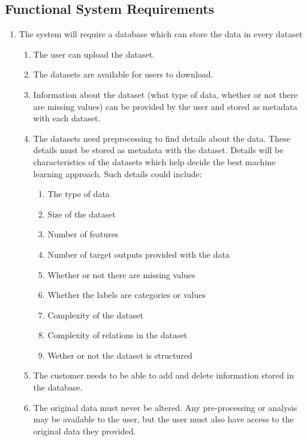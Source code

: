 \documentclass[titlepage]{article}
\begin{document}
\subsection{Functional System Requirements}

\begin{enumerate}
  \item The system will require a database which can store the data in every dataset
  
  \begin{enumerate}
    \item The user can upload the dataset.
  
    \item The datasets are available for users to download.
    
    \item Information about the dataset (what type of data, whether or not there are missing values) can be provided by the user and stored as metadata with each dataset.
    
    \item The datasets need preprocessing to find details about the data. These details must be stored as metadata with the dataset. Details will be characteristics of the datasets which help decide the best machine learning approach. Such details could include:
    \begin{enumerate}
      \item The type of data
      \item Size of the dataset
      \item Number of features
      \item Number of target outputs provided with the data
      \item Whether or not there are missing values
      \item Whether the labels are categories or values
      \item Complexity of the dataset
      \item Complexity of relations in the dataset
      \item Wether or not the dataset is structured
    \end{enumerate}

    \item The customer needs to be able to add and delete information stored in the database.
    
    \item The original data must never be altered. Any pre-processing or analysis may be available to the user, but the user must also have access to the original data they provided.
  \end{enumerate}
  

\end{enumerate}
\end{document}
